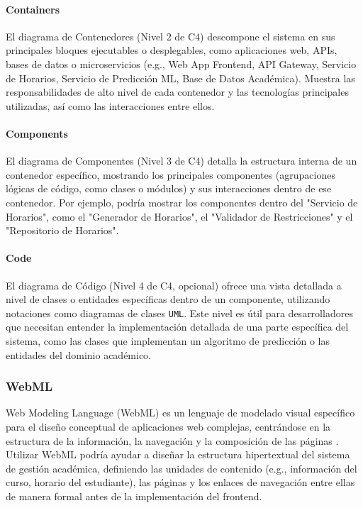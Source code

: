 \paragraph{Containers}
El diagrama de Contenedores (Nivel 2 de C4) descompone el sistema en sus principales bloques ejecutables o desplegables, como aplicaciones web, APIs, bases de datos o microservicios (e.g., Web App Frontend, API Gateway, Servicio de Horarios, Servicio de Predicción ML, Base de Datos Académica).
Muestra las responsabilidades de alto nivel de cada contenedor y las tecnologías principales utilizadas, así como las interacciones entre ellos.

\paragraph{Components}
El diagrama de Componentes (Nivel 3 de C4) detalla la estructura interna de un contenedor específico, mostrando los principales componentes (agrupaciones lógicas de código, como clases o módulos) y sus interacciones dentro de ese contenedor.
Por ejemplo, podría mostrar los componentes dentro del "Servicio de Horarios", como el "Generador de Horarios", el "Validador de Restricciones" y el "Repositorio de Horarios".

\paragraph{Code}
El diagrama de Código (Nivel 4 de C4, opcional) ofrece una vista detallada a nivel de clases o entidades específicas dentro de un componente, utilizando notaciones como diagramas de clases \texttt{UML}.
Este nivel es útil para desarrolladores que necesitan entender la implementación detallada de una parte específica del sistema, como las clases que implementan un algoritmo de predicción o las entidades del dominio académico.

\subsubsection{WebML}
Web Modeling Language (WebML) es un lenguaje de modelado visual específico para el diseño conceptual de aplicaciones web complejas, centrándose en la estructura de la información, la navegación y la composición de las páginas \parencite{Ceri2000}.
Utilizar WebML podría ayudar a diseñar la estructura hipertextual del sistema de gestión académica, definiendo las unidades de contenido (e.g., información del curso, horario del estudiante), las páginas y los enlaces de navegación entre ellas de manera formal antes de la implementación del frontend.

